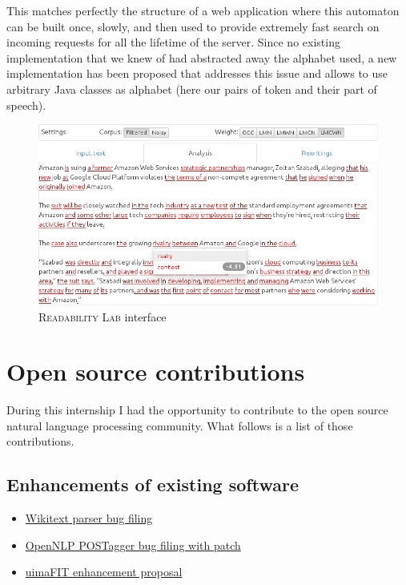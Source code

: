 \documentclass[a4paper, 11pt, onepage]{scrreprt}
\begin{document}
This matches perfectly the structure of a web application where this
automaton can be built once, slowly, and then used to provide
extremely fast search on incoming requests for all the lifetime of the
server. Since no existing implementation that we knew of had
abstracted away the alphabet used, a new implementation has been
proposed that addresses this issue and allows to use arbitrary Java
classes as alphabet (here our pairs of token and their part of
speech).

\begin{figure}[H]
  \centering
  \includegraphics[width=\textwidth]{ui}
  \caption{\textsc{Readability Lab} interface}
  \label{fig:ui}
\end{figure}

\chapter{Open source contributions}
\label{cha:oss-contribs}

During this internship I had the opportunity to contribute to the open
source natural language processing community. What follows is a list
of those contributions.

\section{Enhancements of existing software}
\label{sec:enhancements}

\begin{itemize}
\item
  \href{https://bugs.eclipse.org/bugs/show_bug.cgi?id=433163}{Wikitext
    parser bug filing}
\item \href{https://issues.apache.org/jira/browse/OPENNLP-676}{OpenNLP
    POSTagger bug filing with patch}
\item \href{https://issues.apache.org/jira/browse/UIMA-3913}{uimaFIT
    enhancement proposal}
\end{itemize}
\end{document}
